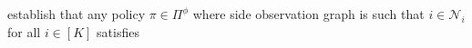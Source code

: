 % 
%
%
%
%
\cite{Sigmetrics15_StochasticBanditsWithSideObservations_BuccapatnamEriyilmazShroff} establish that any policy $\pi \in \Pi^{\phi} 
$ where side observation graph is such that $i \in \mathcal{N}_i$ for all $i\in [K]$ satisfies
